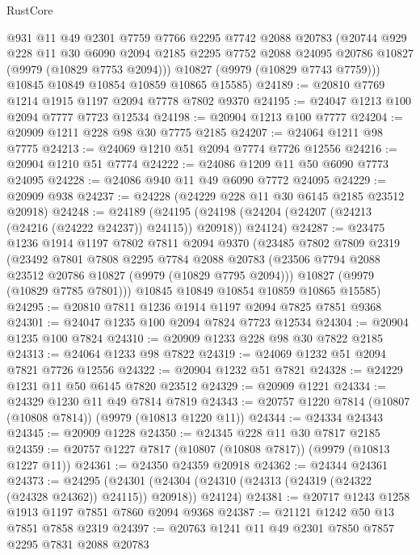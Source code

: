 \begin{lexlean}{RustCore}
\begin{coremodule}
        @931
        @11
        @49
        @2301
        @7759
        @7766
        @2295
        @7742
        @2088
        @20783
        (@20744
          @929
          @228
          @11
          @30
          @6090
          @2094
          @2185
          @2295
          @7752
          @2088
          @24095
          @20786
          @10827
          (@9979 (@10829 @7753 @2094)))
        @10827
        (@9979 (@10829 @7743 @7759)))
      @10845
      @10849
      @10854
      @10859
      @10865
      @15585)
@24189 := @20810 @7769 @1214 @1915 @1197 @2094 @7778 @7802 @9370
@24195 := @24047 @1213 @100 @2094 @7777 @7723 @12534
@24198 := @20904 @1213 @100 @7777
@24204 := @20909 @1211 @228 @98 @30 @7775 @2185
@24207 := @24064 @1211 @98 @7775
@24213 := @24069 @1210 @51 @2094 @7774 @7726 @12556
@24216 := @20904 @1210 @51 @7774
@24222 := @24086 @1209 @11 @50 @6090 @7773 @24095
@24228 := @24086 @940 @11 @49 @6090 @7772 @24095
@24229 := @20909 @938
@24237 := @24228 (@24229 @228 @11 @30 @6145 @2185 @23512 @20918)
@24248 := @24189
    (@24195 (@24198 (@24204 (@24207 (@24213 (@24216 (@24222 @24237)) @24115)) @20918)) @24124)
@24287 := @23475
    @1236
    @1914
    @1197
    @7802
    @7811
    @2094
    @9370
    (@23485
      @7802
      @7809
      @2319
      (@23492
        @7801
        @7808
        @2295
        @7784
        @2088
        @20783
        (@23506 @7794 @2088 @23512 @20786 @10827 (@9979 (@10829 @7795 @2094)))
        @10827
        (@9979 (@10829 @7785 @7801)))
      @10845
      @10849
      @10854
      @10859
      @10865
      @15585)
@24295 := @20810 @7811 @1236 @1914 @1197 @2094 @7825 @7851 @9368
@24301 := @24047 @1235 @100 @2094 @7824 @7723 @12534
@24304 := @20904 @1235 @100 @7824
@24310 := @20909 @1233 @228 @98 @30 @7822 @2185
@24313 := @24064 @1233 @98 @7822
@24319 := @24069 @1232 @51 @2094 @7821 @7726 @12556
@24322 := @20904 @1232 @51 @7821
@24328 := @24229 @1231 @11 @50 @6145 @7820 @23512
@24329 := @20909 @1221
@24334 := @24329 @1230 @11 @49 @7814 @7819
@24343 := @20757 @1220 @7814 (@10807 (@10808 @7814)) (@9979 (@10813 @1220 @11))
@24344 := @24334 @24343
@24345 := @20909 @1228
@24350 := @24345 @228 @11 @30 @7817 @2185
@24359 := @20757 @1227 @7817 (@10807 (@10808 @7817)) (@9979 (@10813 @1227 @11))
@24361 := @24350 @24359 @20918
@24362 := @24344 @24361
@24373 := @24295
    (@24301 (@24304 (@24310 (@24313 (@24319 (@24322 (@24328 @24362)) @24115)) @20918)) @24124)
@24381 := @20717 @1243 @1258 @1913 @1197 @7851 @7860 @2094 @9368
@24387 := @21121 @1242 @50 @13 @7851 @7858 @2319
@24397 := @20763 @1241 @11 @49 @2301 @7850 @7857 @2295 @7831 @2088 @20783

\end{coremodule}
\end{lexlean}
